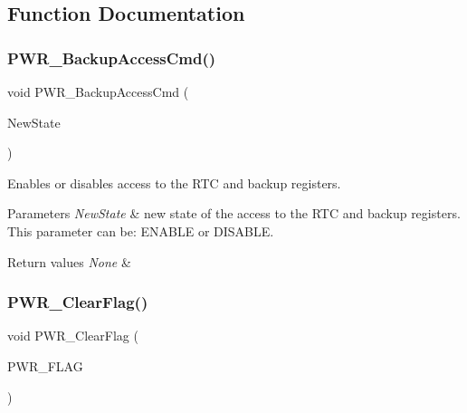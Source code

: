 \subsection{Function Documentation}
\mbox{\label{group___p_w_r___exported___functions_ga0741aea35572b1a75f82b74de12df800}} 
\subsubsection{\texorpdfstring{PWR\_BackupAccessCmd()}{PWR\_BackupAccessCmd()}}
{\footnotesize\ttfamily void P\+W\+R\+\_\+\+Backup\+Access\+Cmd (\begin{DoxyParamCaption}\item[{\mbox{\hyperlink{group___exported__types_gac9a7e9a35d2513ec15c3b537aaa4fba1}{Functional\+State}}}]{New\+State }\end{DoxyParamCaption})}



Enables or disables access to the R\+TC and backup registers. 


\begin{DoxyParams}{Parameters}
{\em New\+State} & new state of the access to the R\+TC and backup registers. This parameter can be\+: E\+N\+A\+B\+LE or D\+I\+S\+A\+B\+LE. \\
\hline
\end{DoxyParams}

\begin{DoxyRetVals}{Return values}
{\em None} & \\
\hline
\end{DoxyRetVals}
\mbox{\label{group___p_w_r___exported___functions_ga01c4b2fbd16514b993324e101c3ddf7c}} 
\subsubsection{\texorpdfstring{PWR\_ClearFlag()}{PWR\_ClearFlag()}}
{\footnotesize\ttfamily void P\+W\+R\+\_\+\+Clear\+Flag (\begin{DoxyParamCaption}\item[{uint32\+\_\+t}]{P\+W\+R\+\_\+\+F\+L\+AG }\end{DoxyParamCaption})}



